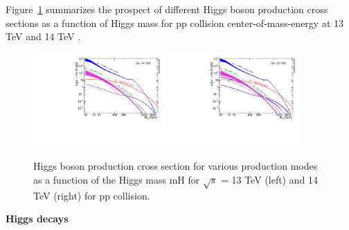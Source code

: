 Figure~\ref{fig:higgs_productions_xs2} summarizes the prospect of different Higgs boson production cross sections 
as a function of Higgs mass for pp collision center-of-mass-energy at 13 TeV and 14 TeV \cite{deFlorian:2227475}. 
\begin{figure}[!htb]
  \centering
  \includegraphics[width=0.45\textwidth]{figures/Theory/plotAll_14tev_BSM_sqrt.pdf}
  \includegraphics[width=0.45\textwidth]{figures/Theory/plotAll_13tev_BSM_sqrt.pdf}
  \caption{Higgs boson production cross section for various production modes as a function of the Higgs mass mH for $\sqrt{s}$ = 13 TeV (left) and 14 TeV (right) for pp collision.}
  \label{fig:higgs_productions_xs2}
\end{figure}

\textbf{Higgs decays}

